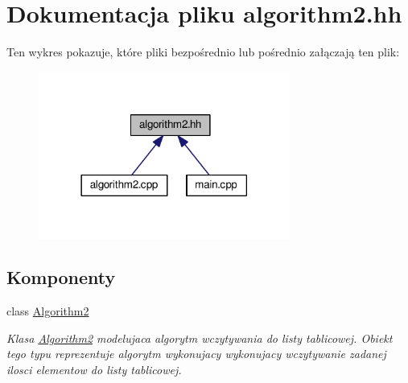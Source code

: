 \hypertarget{algorithm2_8hh}{\section{Dokumentacja pliku algorithm2.\-hh}
\label{algorithm2_8hh}
}
Ten wykres pokazuje, które pliki bezpośrednio lub pośrednio załączają ten plik\-:\nopagebreak
\begin{figure}[H]
\begin{center}
\leavevmode
\includegraphics[width=234pt]{algorithm2_8hh__dep__incl}
\end{center}
\end{figure}
\subsection*{Komponenty}
\begin{DoxyCompactItemize}
\item 
class \hyperlink{class_algorithm2}{Algorithm2}
\begin{DoxyCompactList}\small\item\em Klasa \hyperlink{class_algorithm2}{Algorithm2} modelujaca algorytm wczytywania do listy tablicowej. Obiekt tego typu reprezentuje algorytm wykonujacy wykonujacy wczytywanie zadanej ilosci elementow do listy tablicowej. \end{DoxyCompactList}\end{DoxyCompactItemize}
